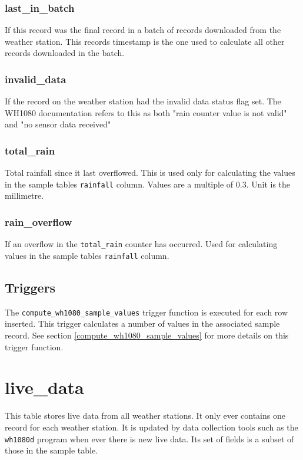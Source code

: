 \documentclass[a4paper,10pt]{book}
\begin{document}
\subsubsection{last\_in\_batch}
If this record was the final record in a batch of records downloaded from the weather station. This records timestamp is the one used to calculate all other records downloaded in the batch.

\subsubsection{invalid\_data}
If the record on the weather station had the invalid data status flag set. The WH1080 documentation refers to this as both "rain counter value is not valid" and "no sensor data received"

\subsubsection{total\_rain}
Total rainfall since it last overflowed. This is used only for calculating the values in the sample tables \verb|rainfall| column. Values are a multiple of 0.3. Unit is the millimetre. 

\subsubsection{rain\_overflow}
If an overflow in the \verb|total_rain| counter has occurred. Used for calculating values in the sample tables \verb|rainfall| column.

\subsection{Triggers}
The \verb|compute_wh1080_sample_values| trigger function is executed for each row inserted. This trigger calculates a number of values in the associated sample record. See section \ref{compute_wh1080_sample_values} for more details on this trigger function.

\section{live\_data}
This table stores live data from all weather stations. It only ever contains one record for each weather station. It is updated by data collection tools such as the \verb|wh1080d| program when ever there is new live data. Its set of fields is a subset of those in the sample table.
\end{document}
